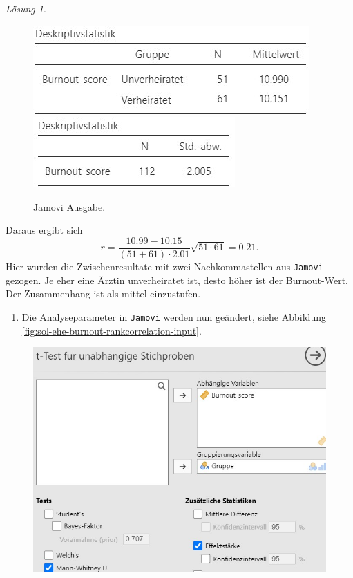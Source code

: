 \documentclass[
]{book}
\providecommand{\tightlist}{%
  \setlength{\itemsep}{0pt}\setlength{\parskip}{0pt}}
\theoremstyle{definition}
\theoremstyle{definition}
\theoremstyle{definition}
\theoremstyle{definition}
\theoremstyle{remark}
\newtheorem*{solution}{Lösung}
\begin{document}
\begin{solution}
\begin{figure}

{\centering \includegraphics[height=0.5\textheight]{figures/08-exr-ehe-burnout-pointcorrelation-jmv-output1} \includegraphics[height=0.5\textheight]{figures/08-exr-ehe-burnout-pointcorrelation-jmv-output2} 

}

\caption{Jamovi Ausgabe.}\label{fig:sol-ehe-burnout-pointcorrelation-output}
\end{figure}

Daraus ergibt sich
\[ r = \frac{10.99- 10.15}{(51+61)\cdot 2.01}\sqrt{51\cdot 61} = 0.21.\]
Hier wurden die Zwischenresultate mit zwei Nachkommastellen aus \texttt{Jamovi} gezogen. Je eher eine Ärztin unverheiratet ist, desto höher ist der Burnout-Wert. Der Zusammenhang ist als mittel einzustufen.

\begin{enumerate}
\def\labelenumi{\alph{enumi})}
\setcounter{enumi}{1}
\tightlist
\item
  Die Analyseparameter in \texttt{Jamovi} werden nun geändert, siehe Abbildung \ref{fig:sol-ehe-burnout-rankcorrelation-input}.
\end{enumerate}

\begin{figure}

{\centering \includegraphics{figures/08-exr-ehe-burnout-pointcorrelation-jmv-input3} 

}
\end{figure}
\end{solution}
\end{document}
